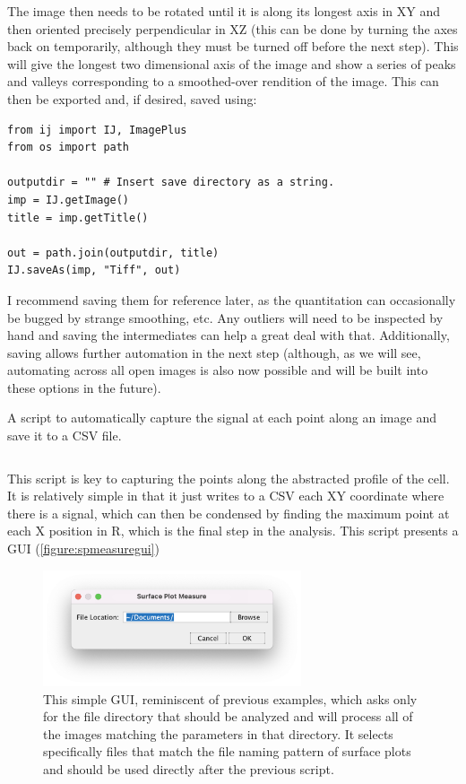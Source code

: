The image then needs to be rotated until it is along its longest axis in XY and then oriented precisely perpendicular in XZ (this can be done by turning the axes back on temporarily, although they must be turned off before the next step). This will give the longest two dimensional axis of the image and show a series of peaks and valleys corresponding to a smoothed\hyp{}over rendition of the image. This can then be exported and, if desired, saved using:

\begin{code}
\begin{verbatim}
from ij import IJ, ImagePlus
from os import path

outputdir = "" # Insert save directory as a string.
imp = IJ.getImage()
title = imp.getTitle()

out = path.join(outputdir, title)
IJ.saveAs(imp, "Tiff", out)
\end{verbatim}
\end{code}

I recommend saving them for reference later, as the quantitation can occasionally be bugged by strange smoothing, etc. Any outliers will need to be inspected by hand and saving the intermediates can help a great deal with that. Additionally, saving allows further automation in the next step (although, as we will see, automating across all open images is also now possible and will be built into these options in the future).

\begin{code}
\caption{A script to automatically capture the signal at each point along an image and save it to a CSV file.}
\label{surfaceplot}

\inputminted[breaklines,frame=single,fontsize=\small]{python}{source/autoSurfacePlotMeasure.py}

\end{code}

This script is key to capturing the points along the abstracted profile of the cell. It is relatively simple in that it just writes to a CSV each XY coordinate where there is a signal, which can then be condensed by finding the maximum point at each X position in R, which is the final step in the analysis. This script presents a GUI (\autoref{figure:spmeasuregui})

\begin{figure}
\centering
\includegraphics[width=3in]{images/spmeasuregui.png}
\caption{This simple GUI, reminiscent of previous examples, which asks only for the file directory that should be analyzed and will process all of the images matching the parameters in that directory. It selects specifically files that match the file naming pattern of surface plots and should be used directly after the previous script.}
\label{figure:spmeasuregui}
\end{figure}

